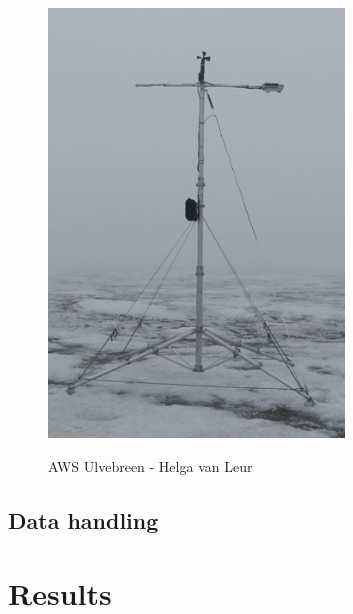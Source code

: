 \documentclass[11pt]{report}
\begin{document}
\begin{figure}[h]
\begin{minipage}{0.5\textwidth}
    \includegraphics[width=0.7\textwidth]{ulve.jpg}
    \label{fig:instrumentu}
    \caption{AWS Ulvebreen - Helga van Leur}
\end{minipage}%
\end{figure}

\section{Data handling}



\newpage
\chapter{Results}\label{sec:results}
\end{document}

